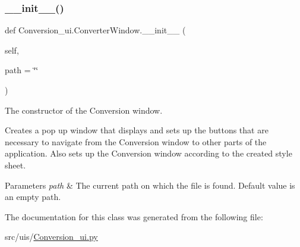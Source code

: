 \subsubsection{\texorpdfstring{\+\_\+\+\_\+init\+\_\+\+\_\+()}{\_\_init\_\_()}}
{\footnotesize\ttfamily def Conversion\+\_\+ui.\+Converter\+Window.\+\_\+\+\_\+init\+\_\+\+\_\+ (\begin{DoxyParamCaption}\item[{}]{self,  }\item[{}]{path = {\ttfamily \char`\"{}\char`\"{}} }\end{DoxyParamCaption})}



The constructor of the Conversion window. 

Creates a pop up window that displays and sets up the buttons that are necessary to navigate from the Conversion window to other parts of the application. Also sets up the Conversion window according to the created style sheet. 
\begin{DoxyParams}{Parameters}
{\em path} & The current path on which the file is found. Default value is an empty path. \\
\hline
\end{DoxyParams}


The documentation for this class was generated from the following file\+:\begin{DoxyCompactItemize}
\item 
src/uis/\hyperlink{_conversion__ui_8py}{Conversion\+\_\+ui.\+py}\end{DoxyCompactItemize}
